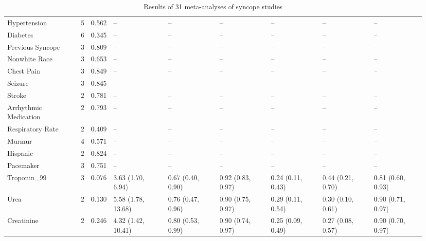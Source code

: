 \begin{table}[ht]
\begin{tabular}{lllllllll}
  Hypertension & 5 & 0.562 & -- & -- & -- & -- & -- & -- \\ 
  Diabetes & 6 & 0.345 & -- & -- & -- & -- & -- & -- \\ 
  Previous Syncope & 3 & 0.809 & -- & -- & -- & -- & -- & -- \\ 
  Nonwhite Race & 3 & 0.653 & -- & -- & -- & -- & -- & -- \\ 
  Chest Pain & 3 & 0.849 & -- & -- & -- & -- & -- & -- \\ 
  Seizure & 3 & 0.845 & -- & -- & -- & -- & -- & -- \\ 
  Stroke & 2 & 0.781 & -- & -- & -- & -- & -- & -- \\ 
  Arrhythmic Medication & 2 & 0.793 & -- & -- & -- & -- & -- & -- \\ 
  Respiratory Rate & 2 & 0.409 & -- & -- & -- & -- & -- & -- \\ 
  Murmur & 4 & 0.571 & -- & -- & -- & -- & -- & -- \\ 
  Hispanic & 2 & 0.824 & -- & -- & -- & -- & -- & -- \\ 
  Pacemaker & 3 & 0.751 & -- & -- & -- & -- & -- & -- \\ 
  Troponin\_99 & 3 & 0.076 & 3.63 (1.70, 6.94) & 0.67 (0.40, 0.90) & 0.92 (0.83, 0.97) & 0.24 (0.11, 0.43) & 0.44 (0.21, 0.70) & 0.81 (0.60, 0.93) \\ 
  Urea & 2 & 0.130 & 5.58 (1.78, 13.68) & 0.76 (0.47, 0.96) & 0.90 (0.75, 0.97) & 0.29 (0.11, 0.54) & 0.30 (0.10, 0.61) & 0.90 (0.71, 0.97) \\ 
  Creatinine & 2 & 0.246 & 4.32 (1.42, 10.41) & 0.80 (0.53, 0.99) & 0.90 (0.74, 0.97) & 0.25 (0.09, 0.49) & 0.27 (0.08, 0.57) & 0.90 (0.70, 0.97) \\ 
   \hline
\end{tabular}
\caption{Results of 31 meta-analyses of syncope studies} 
\end{table}
